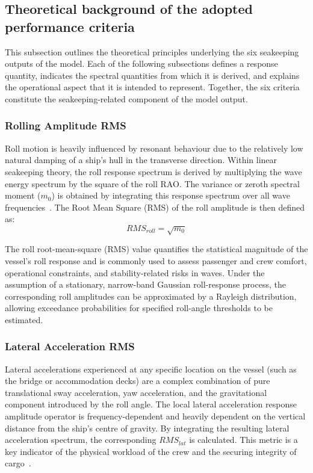 \documentclass[final,5p,times,twocolumn,numbers]{elsarticle}
\begin{document}
\subsection{Theoretical background of the adopted performance criteria}
This subsection outlines the theoretical principles underlying the six seakeeping outputs of the model. Each of the following subsections defines a response quantity, indicates the spectral quantities from which it is derived, and explains the operational aspect that it is intended to represent. Together, the six criteria constitute the seakeeping-related component of the model output.

\subsubsection{Rolling Amplitude RMS}
Roll motion is heavily influenced by resonant behaviour due to the relatively low natural damping of a ship's hull in the transverse direction. Within linear seakeeping theory, the roll response spectrum is derived by multiplying the wave energy spectrum by the square of the roll RAO. The variance or zeroth spectral moment ($m_0$) is obtained by integrating this response spectrum over all wave frequencies~\cite{faltinsen1990,journee2002}. The Root Mean Square (RMS) of the roll amplitude is then defined as:
\begin{equation}
RMS_{roll} = \sqrt{m_0}
\end{equation}

The roll root-mean-square (RMS) value quantifies the statistical magnitude of the vessel’s roll response and is commonly used to assess passenger and crew comfort, operational constraints, and stability-related risks in waves. Under the assumption of a stationary, narrow-band Gaussian roll-response process, the corresponding roll amplitudes can be approximated by a Rayleigh distribution, allowing exceedance probabilities for specified roll-angle thresholds to be estimated.


\subsubsection{Lateral Acceleration RMS}
Lateral accelerations experienced at any specific location on the vessel (such as the bridge or accommodation decks) are a complex combination of pure translational sway acceleration, yaw acceleration, and the gravitational component introduced by the roll angle. The local lateral acceleration response amplitude operator is frequency-dependent and heavily dependent on the vertical distance from the ship's centre of gravity. By integrating the resulting lateral acceleration spectrum, the corresponding $RMS_{lat}$ is calculated. This metric is a key indicator of the physical workload of the crew and the securing integrity of cargo~\cite{lloyd1998,molland2008}.
\end{document}
